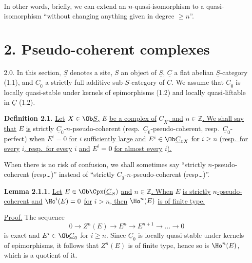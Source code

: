 %
In other words, briefly, we can extend an \(n\)-quasi-isomorphism to a quasi-isomorphism ``without changing anything given in degree \(\geq n\)''.

\section*{2. Pseudo-coherent complexes}

2.0. In this section, \(\underline{S}\) denotes a site, \(S\) an object of \(\underline{S}\), \(\underline{C}\) a flat abelian \(\underline{S}\)-category (1.1), and \(\underline{C}_0\) a strictly full additive sub-\(\underline{S}\)-category of \(\underline{C}\). We assume that \(\underline{C}_0\) is locally quasi-stable under kernels of epimorphisms (1.2) and locally quasi-liftable in \(\underline{C}\) (1.2).

\textbf{Definition 2.1.} \uline{Let} \(X\in\Ob \underline{S}\)\uline{,} \(E\) \uline{be a complex of} \(\underline{C}_X\)\uline{, and} \(n\in\mathbb Z\)\uline{. We shall say that} \(E\) \uline{is} strictly \(\underline{C}_0\)-\(n\)-pseudo-coherent (resp.\ \(\underline{C}_0\)-pseudo-coherent, resp.\ \(\underline{C}_0\)-perfect) \uline{when} \(E^i=0\) \uline{for} \(i\) \uline{sufficiently large and} \(E^i\in\Ob\underline{C}_{0X}\) \uline{for} \(i\geq n\) \uline{(resp.\ for every} \(i\)\uline{, resp.\ for every} \(i\) \uline{and} \(E^i=0\) \uline{for almost every} \(i\)\uline{).}

When there is no risk of confusion, we shall sometimes say ``strictly \(n\)-pseudo-coherent (resp\dots)'' instead of ``strictly \(\underline{C}_0\)-\(n\)-pseudo-coherent (resp\dots)''.

\textbf{Lemma 2.1.1.} \uline{Let} \(E\in\Ob\Cpx(\underline{C}_S)\) \uline{and} \(n\in\mathbb Z\)\uline{. When} \(E\) \uline{is strictly} \(n\)\uline{-pseudo-coherent and} \(\Ho^i(E)=0\) \uline{for} \(i>n\)\uline{, then} \(\Ho^n(E)\) \uline{is of finite type.}

\uline{Proof.} The sequence
\[
  0\longrightarrow Z^n(E)\longrightarrow E^n\longrightarrow E^{n+1}\longrightarrow\ldots\longrightarrow 0
\]
is exact and \(E^i\in\Ob\underline{C}_0\) for \(i\geq n\). Since \(\underline{C}_0\) is locally quasi-stable under kernels of epimorphisms, it follows that \(Z^n(E)\) is of finite type, hence so is \(\Ho^n(E)\), which is a quotient of it.


